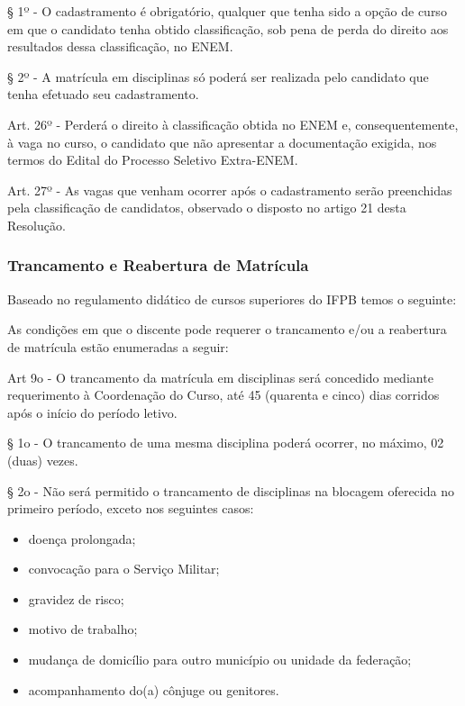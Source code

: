 § 1º - O cadastramento é obrigatório, qualquer que tenha sido a opção de curso em que o candidato tenha obtido classificação, sob pena de perda do direito aos resultados dessa classificação, no ENEM.

§ 2º - A matrícula em disciplinas só poderá ser realizada pelo candidato que tenha efetuado seu cadastramento.

Art. 26º - Perderá o direito à classificação obtida no ENEM e, consequentemente, à vaga no curso, o candidato que não apresentar a documentação exigida, nos termos do Edital do Processo Seletivo Extra-ENEM.

Art. 27º - As vagas que venham ocorrer após o cadastramento serão preenchidas pela classificação de candidatos, observado o disposto no artigo 21 desta Resolução.


\subsubsection{Trancamento e Reabertura de Matrícula}

Baseado no regulamento didático de cursos superiores do IFPB temos o seguinte:

	As condições em que o discente pode requerer o trancamento e/ou a reabertura de matrícula estão enumeradas a seguir:
	
Art 9o - O trancamento da matrícula em disciplinas será concedido mediante requerimento à Coordenação do Curso, até 45 (quarenta e cinco) dias corridos após o início do período letivo.

§ 1o - O trancamento de uma mesma disciplina poderá ocorrer, no máximo, 02 (duas) vezes.

§ 2o - Não será permitido o trancamento de disciplinas na blocagem oferecida no primeiro período, exceto nos seguintes casos:

\begin{itemize}
	\item doença prolongada;
	\item convocação para o Serviço Militar;
	\item gravidez de risco;
	\item motivo de trabalho;
	\item mudança de domicílio para outro município ou unidade da federação; 
	\item acompanhamento do(a) cônjuge ou genitores.
\end{itemize}

